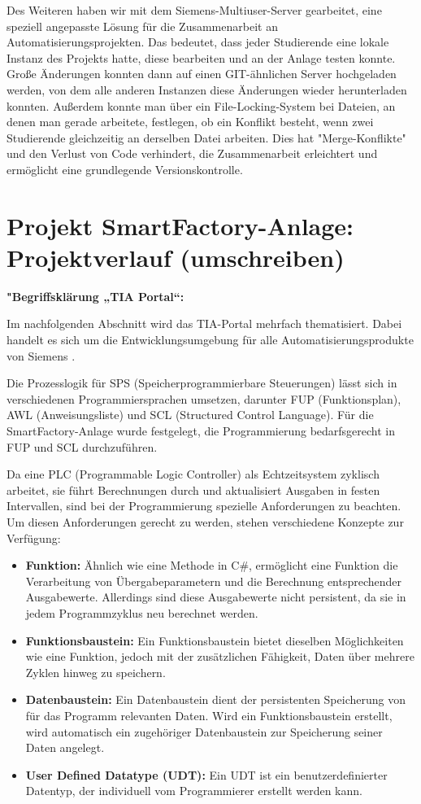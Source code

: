 Des Weiteren haben wir mit dem Siemens-Multiuser-Server gearbeitet, eine  speziell angepasste Lösung für die Zusammenarbeit an 
Automatisierungsprojekten. Das bedeutet, dass jeder Studierende eine lokale 
Instanz des Projekts hatte, diese bearbeiten und an der Anlage testen konnte. Große Änderungen konnten dann auf einen 
GIT-ähnlichen Server hochgeladen werden, von dem alle anderen Instanzen diese Änderungen wieder herunterladen konnten. 
Außerdem konnte man über ein File-Locking-System bei Dateien, an denen man gerade arbeitete, festlegen, ob ein Konflikt 
besteht, wenn zwei Studierende gleichzeitig an derselben Datei arbeiten. Dies hat "Merge-Konflikte" und den Verlust 
von Code verhindert, die Zusammenarbeit erleichtert und ermöglicht eine grundlegende Versionskontrolle.

\section{Projekt SmartFactory-Anlage: Projektverlauf (umschreiben)}

\textbf{"Begriffsklärung „TIA Portal“:}

Im nachfolgenden Abschnitt wird das TIA-Portal mehrfach thematisiert. Dabei handelt es sich um die 
Entwicklungsumgebung für alle Automatisierungsprodukte von Siemens \cite{bee2022}.

Die Prozesslogik für SPS (Speicherprogrammierbare Steuerungen) lässt sich in verschiedenen Programmiersprachen umsetzen, 
darunter FUP (Funktionsplan), AWL (Anweisungsliste) und SCL (Structured Control Language). Für die SmartFactory-Anlage 
wurde festgelegt, die Programmierung bedarfsgerecht in FUP und SCL durchzuführen.

Da eine PLC (Programmable Logic Controller) als Echtzeitsystem zyklisch arbeitet, sie führt 
Berechnungen durch und aktualisiert Ausgaben in festen Intervallen, sind bei der Programmierung spezielle Anforderungen 
zu beachten. Um diesen Anforderungen gerecht zu werden, stehen verschiedene Konzepte zur Verfügung:

\begin{itemize}
    \item \textbf{Funktion:} Ähnlich wie eine Methode in C\#, ermöglicht eine Funktion die Verarbeitung von Übergabeparametern 
    und die Berechnung entsprechender Ausgabewerte. Allerdings sind diese Ausgabewerte nicht persistent, da sie in jedem 
    Programmzyklus neu berechnet werden.
    \item \textbf{Funktionsbaustein:} Ein Funktionsbaustein bietet dieselben Möglichkeiten wie eine Funktion, jedoch mit der 
    zusätzlichen Fähigkeit, Daten über mehrere Zyklen hinweg zu speichern.
    \item \textbf{Datenbaustein:} Ein Datenbaustein dient der persistenten Speicherung von für das Programm relevanten Daten. 
    Wird ein Funktionsbaustein erstellt, wird automatisch ein zugehöriger Datenbaustein zur Speicherung seiner Daten angelegt.
    \item \textbf{User Defined Datatype (UDT):} Ein UDT ist ein benutzerdefinierter Datentyp, der individuell vom 
    Programmierer erstellt werden kann.
\end{itemize}


